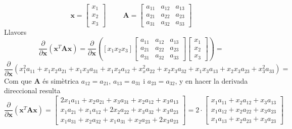 \documentclass[twoside]{article}
\begin{document}
\begin{equation}
\pmb{x}=\left[ \begin{array}{c}
x_1 \\
x_2 \\
x_3 
\end{array} \right] \hspace{1cm} \pmb{A}=\left[ \begin{array}{ccc}
a_{11} & a_{12} & a_{13} \\
a_{21} & a_{22} & a_{23} \\
a_{31} & a_{32} & a_{33} 
\end{array} \right]
\end{equation}
Llavors
\begin{equation}
\frac{\partial}{\partial \pmb{x}}(\pmb{x}^{T}\pmb{A} \pmb{x}) = \frac{\partial}{\partial \pmb{x}}\left(\left[x_1 x_2 x_3 \right]\left[\begin{array}{ccc}
a_{11} & a_{12} & a_{13} \\
a_{21} & a_{22} & a_{23} \\
a_{31} & a_{32} & a_{33} 
\end{array} \right]\left[\begin{array}{c}
x_1 \\
x_2 \\
x_3 
\end{array} \right] \right) =
\end{equation}
\begin{equation}
\frac{\partial}{\partial \pmb{x}}(x^2_1 a_{11}+x_1x_2a_{21}+x_1x_3a_{31} + x_1x_2a_{12}+x^2_xa_{22}+x_2x_3a_{32} + x_1x_3a_{13}+x_2x_3a_{23}+x^2_3a_{33})=
\end{equation}
Com que $\pmb{A}$ és simètrica $a_{12}=a_{21}$, $a_{13}=a_{31}$ i $a_{23}=a_{32}$, y en hacer la derivada direccional resulta
\begin{equation}
\frac{\partial}{\partial \pmb{x}}(\pmb{x}^{T}\pmb{A} \pmb{x})=\left[ \begin{array}{c}
2x_1a_{11}+x_2a_{21}+x_3a_{31}+x_2a_{12}+x_3a_{13} \\
x_1a_{21}+x_1a_{12}+2x_2a_{22}+x_3a_{32}+x_3a_{23} \\
x_1a_{31}+x_2a_{32}+x_1a_{31}+x_2a_{23}+2x_3a_{23}
\end{array} \right]=2\cdot\left[ \begin{array}{c}
x_1a_{11}+x_2a_{12}+x_3a_{13} \\
x_1a_{12}+x_2a_{22}+x_3a_{23} \\
x_1a_{13}+x_2a_{23}+x_3a_{23}
\end{array} \right]
\end{equation}
\end{document}
